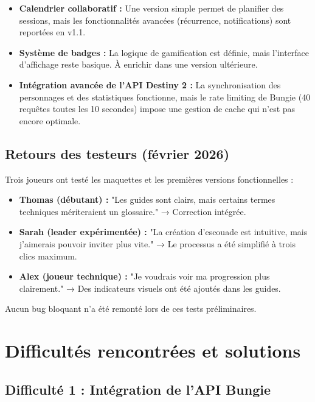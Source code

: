 \begin{itemize}
    \item \textbf{Calendrier collaboratif :} Une version simple permet de planifier des sessions, mais les fonctionnalités avancées (récurrence, notifications) sont reportées en v1.1.
    \item \textbf{Système de badges :} La logique de gamification est définie, mais l'interface d'affichage reste basique. À enrichir dans une version ultérieure.
    \item \textbf{Intégration avancée de l'API Destiny 2 :} La synchronisation des personnages et des statistiques fonctionne, mais le rate limiting de Bungie (40 requêtes toutes les 10 secondes) impose une gestion de cache qui n'est pas encore optimale.
\end{itemize}

\subsection*{Retours des testeurs (février 2026)}

Trois joueurs ont testé les maquettes et les premières versions fonctionnelles :

\begin{itemize}
    \item \textbf{Thomas (débutant) :} "Les guides sont clairs, mais certains termes techniques mériteraient un glossaire." → Correction intégrée.
    \item \textbf{Sarah (leader expérimentée) :} "La création d'escouade est intuitive, mais j'aimerais pouvoir inviter plus vite." → Le processus a été simplifié à trois clics maximum.
    \item \textbf{Alex (joueur technique) :} "Je voudrais voir ma progression plus clairement." → Des indicateurs visuels ont été ajoutés dans les guides.
\end{itemize}

Aucun bug bloquant n'a été remonté lors de ces tests préliminaires.

\section{Difficultés rencontrées et solutions}

\subsection*{Difficulté 1 : Intégration de l'API Bungie}

